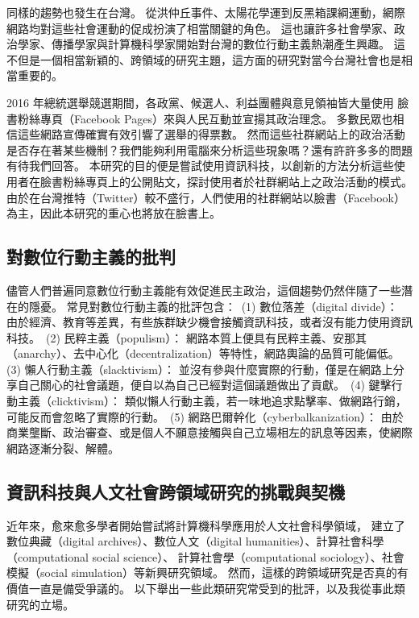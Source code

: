 \documentclass[a4paper, 10pt, conference]{ieeeconf}       %
\begin{document}
\begin{CJK}{UTF8}{bsmi}
同樣的趨勢也發生在台灣。%
從洪仲丘事件、太陽花學運到反黑箱課綱運動，網際網路均對這些社會運動的促成扮演了相當關鍵的角色。%
這也讓許多社會學家、政治學家、傳播學家與計算機科學家開始對台灣的數位行動主義熱潮產生興趣。%
這不但是一個相當新穎的、跨領域的研究主題，這方面的研究對當今台灣社會也是相當重要的。%

2016 年總統選舉競選期間，各政黨、候選人、利益團體與意見領袖皆大量使用%
臉書粉絲專頁（Facebook Pages）來與人民互動並宣揚其政治理念。%
多數民眾也相信這些網路宣傳確實有效引響了選舉的得票數。%
然而這些社群網站上的政治活動是否存在著某些機制？我們能夠利用電腦來分析這些現象嗎？還有許許多多的問題有待我們回答。%
本研究的目的便是嘗試使用資訊科技，以創新的方法分析這些使用者在臉書粉絲專頁上的公開貼文，探討使用者於社群網站上之政治活動的模式。%
由於在台灣推特（Twitter）較不盛行，人們使用的社群網站以臉書（Facebook）為主，因此本研究的重心也將放在臉書上。%

\subsection*{對數位行動主義的批判}

儘管人們普遍同意數位行動主義能有效促進民主政治，這個趨勢仍然伴隨了一些潛在的隱憂。%
常見對數位行動主義的批評包含：%
\,(1) 數位落差（digital divide）：%
由於經濟、教育等差異，有些族群缺少機會接觸資訊科技，或者沒有能力使用資訊科技。%
\,(2) 民粹主義（populism）：%
網路本質上便具有民粹主義、安那其（anarchy）、去中心化（decentralization）等特性，網路輿論的品質可能偏低。%
\,(3) 懶人行動主義（slacktivism）：%
並沒有參與什麼實際的行動，僅是在網路上分享自己關心的社會議題，便自以為自己已經對這個議題做出了貢獻。%
\,(4) 鍵擊行動主義（clicktivism）：%
類似懶人行動主義，若一味地追求點擊率、做網路行銷，可能反而會忽略了實際的行動。%
\,(5) 網路巴爾幹化（cyberbalkanization）：%
由於商業壟斷、政治審查、或是個人不願意接觸與自己立場相左的訊息等因素，使網際網路逐漸分裂、解體。%

\subsection*{資訊科技與人文社會跨領域研究的挑戰與契機}

近年來，愈來愈多學者開始嘗試將計算機科學應用於人文社會科學領域，%
建立了數位典藏（digital archives）、數位人文（digital humanities）、計算社會科學（computational social science）、%
計算社會學（computational sociology）、社會模擬（social simulation）等新興研究領域。%
然而，這樣的跨領域研究是否真的有價值一直是備受爭議的。%
以下舉出一些此類研究常受到的批評，以及我從事此類研究的立場。%


\end{CJK}
\end{document}

